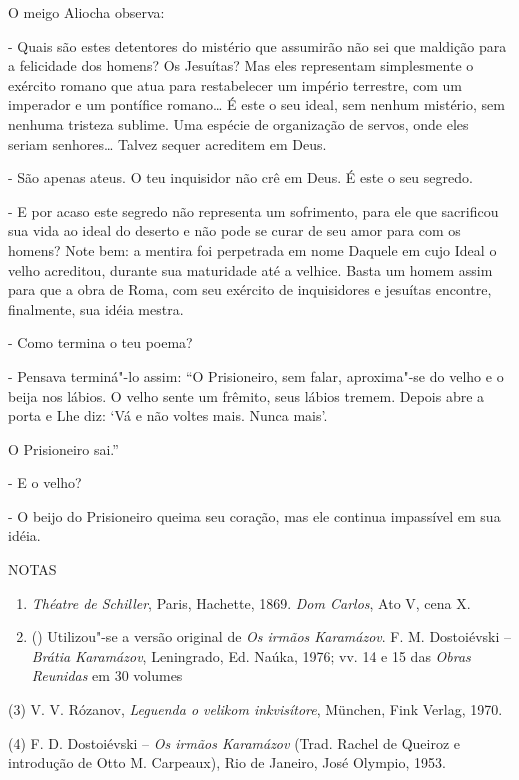 O meigo Aliocha observa:

- Quais são estes detentores do mistério que assumirão não sei que
maldição para a felicidade dos homens? Os Jesuítas? Mas eles representam
simplesmente o exército romano que atua para restabelecer um império
terrestre, com um imperador e um pontífice romano\ldots{} É este o seu ideal,
sem nenhum mistério, sem nenhuma tristeza sublime. Uma espécie de
organização de servos, onde eles seriam senhores\ldots{} Talvez sequer
acreditem em Deus.

- São apenas ateus. O teu inquisidor não crê em Deus. É este o seu
segredo.

- E por acaso este segredo não representa um sofrimento, para ele que
sacrificou sua vida ao ideal do deserto e não pode se curar de seu amor
para com os homens? Note bem: a mentira foi perpetrada em nome Daquele
em cujo Ideal o velho acreditou, durante sua maturidade até a velhice.
Basta um homem assim para que a obra de Roma, com seu exército de
inquisidores e jesuítas encontre, finalmente, sua idéia mestra.

- Como termina o teu poema?

- Pensava terminá"-lo assim: ``O Prisioneiro, sem falar, aproxima"-se do
velho e o beija nos lábios. O velho sente um frêmito, seus lábios
tremem. Depois abre a porta e Lhe diz: `Vá e não voltes mais. Nunca
mais'.

O Prisioneiro sai.''

- E o velho?

- O beijo do Prisioneiro queima seu coração, mas ele continua impassível
em sua idéia.

NOTAS

\begin{enumerate}
\def\labelenumi{(\arabic{enumi})}
\item
  \emph{Théatre de Schiller}, Paris, Hachette, 1869. \emph{Dom Carlos},
  Ato V, cena X.
\item
  () Utilizou"-se a versão original de \emph{Os irmãos Karamázov}. F. M.
  Dostoiévski -- \emph{Brátia Karamázov}, Leningrado, Ed. Naúka, 1976;
  vv. 14 e 15 das \emph{Obras Reunidas} em 30 volumes
\end{enumerate}

(3) V. V. Rózanov, \emph{Leguenda o velikom inkvisítore}, München, Fink
Verlag, 1970.

(4) F. D. Dostoiévski -- \emph{Os irmãos Karamázov} (Trad. Rachel de
Queiroz e introdução de Otto M. Carpeaux), Rio de Janeiro, José Olympio,
1953.

